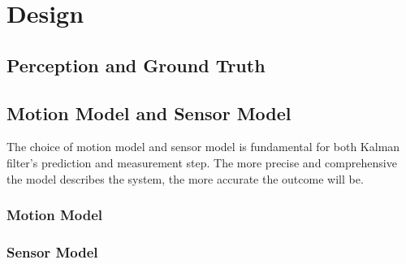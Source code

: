 \chapter{Design\label{cha:chapter3}}

\section{Perception and Ground Truth}\label{sec:3.1}

\section{Motion Model and Sensor Model}\label{sec:3.2}
The choice of motion model and sensor model is fundamental for both Kalman filter's prediction and measurement step. The more precise and comprehensive the model describes the system, the more accurate the outcome will be. 

\subsection{Motion Model}\label{sub:Motion Model}


\subsection{Sensor Model}\label{sub:Sensor Model}



